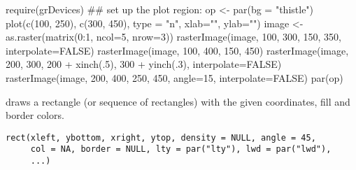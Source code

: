 %
\begin{Examples}
\begin{ExampleCode}
require(grDevices)
## set up the plot region:
op <- par(bg = "thistle")
plot(c(100, 250), c(300, 450), type = "n", xlab="", ylab="")
image <- as.raster(matrix(0:1, ncol=5, nrow=3))
rasterImage(image, 100, 300, 150, 350, interpolate=FALSE)
rasterImage(image, 100, 400, 150, 450)
rasterImage(image, 200, 300, 200 + xinch(.5), 300 + yinch(.3),
       interpolate=FALSE)
rasterImage(image, 200, 400, 250, 450, angle=15, interpolate=FALSE)
par(op)
\end{ExampleCode}
\end{Examples}
%
\begin{Description}\relax
{} draws a rectangle (or sequence of rectangles) with the
given coordinates, fill and border colors.
\end{Description}
%
\begin{Usage}
\begin{verbatim}
rect(xleft, ybottom, xright, ytop, density = NULL, angle = 45,
     col = NA, border = NULL, lty = par("lty"), lwd = par("lwd"),
     ...)
\end{verbatim}
\end{Usage}
%
